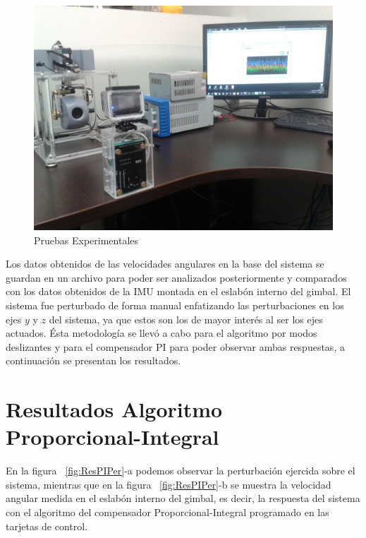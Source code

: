 \begin{figure}[H]
\centering
      \includegraphics[scale=0.09]{img/Experimentacion.jpg}
      \caption{Pruebas Experimentales}
      \label{fig:Prueba}
\end{figure}

Los datos obtenidos de las velocidades angulares en la base del sistema se guardan en un archivo para poder ser analizados posteriormente y comparados con los datos obtenidos de la IMU montada en el eslab\'{o}n interno del gimbal. El sistema fue perturbado de forma manual enfatizando las perturbaciones en los ejes $y$ y $z$ del sistema, ya que estos son los de mayor inter\'{e}s al ser los ejes actuados. \'{E}sta metodolog\'{i}a se llev\'{o} a cabo para el algoritmo por modos deslizantes y para el compensador PI para poder observar ambas respuestas, a continuaci\'{o}n se presentan los resultados. 


\section{Resultados Algoritmo Proporcional-Integral}  

En la figura ~\ref{fig:ResPIPer}-a podemos observar la perturbaci\'{o}n ejercida sobre el sistema, mientras que en la figura ~\ref{fig:ResPIPer}-b se muestra la velocidad angular medida en el eslab\'{o}n interno del gimbal, es decir, la respuesta del sistema con el algoritmo del compensador Proporcional-Integral programado en las tarjetas de control. 

